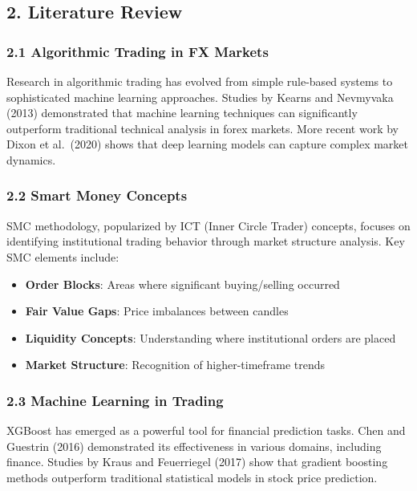 \subsection{2. Literature Review}\label{literature-review}

\subsubsection{2.1 Algorithmic Trading in FX
Markets}\label{algorithmic-trading-in-fx-markets}

Research in algorithmic trading has evolved from simple rule-based
systems to sophisticated machine learning approaches. Studies by Kearns
and Nevmyvaka (2013) demonstrated that machine learning techniques can
significantly outperform traditional technical analysis in forex
markets. More recent work by Dixon et al.~(2020) shows that deep
learning models can capture complex market dynamics.

\subsubsection{2.2 Smart Money Concepts}\label{smart-money-concepts}

SMC methodology, popularized by ICT (Inner Circle Trader) concepts,
focuses on identifying institutional trading behavior through market
structure analysis. Key SMC elements include:

\begin{itemize}
\tightlist
\item
  \textbf{Order Blocks}: Areas where significant buying/selling occurred
\item
  \textbf{Fair Value Gaps}: Price imbalances between candles
\item
  \textbf{Liquidity Concepts}: Understanding where institutional orders
  are placed
\item
  \textbf{Market Structure}: Recognition of higher-timeframe trends
\end{itemize}

\subsubsection{2.3 Machine Learning in
Trading}\label{machine-learning-in-trading}

XGBoost has emerged as a powerful tool for financial prediction tasks.
Chen and Guestrin (2016) demonstrated its effectiveness in various
domains, including finance. Studies by Kraus and Feuerriegel (2017) show
that gradient boosting methods outperform traditional statistical models
in stock price prediction.

